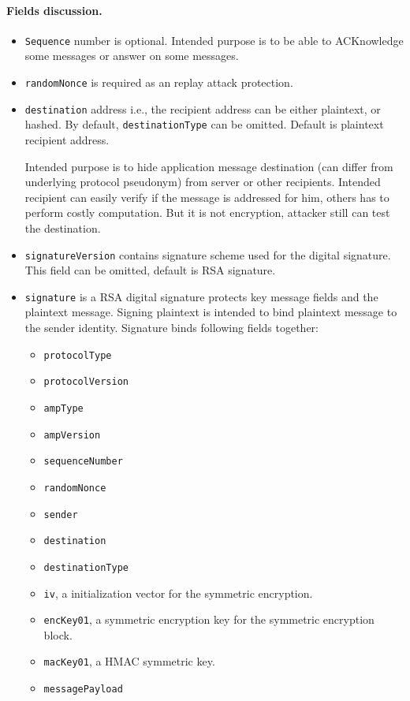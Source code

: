 \documentclass[a4paper,10pt]{article}
\begin{document}
\paragraph{Fields discussion.}
\begin{itemize}
 \item \verb#Sequence# number is optional. Intended purpose is to be able to ACKnowledge some messages or answer on some messages.
 \item \verb#randomNonce# is required as an replay attack protection.
 \item \verb#destination# address i.e., the recipient address can be either plaintext, or hashed. By default, \verb#destinationType# can be omitted.
 Default is plaintext recipient address. 
 
 Intended purpose is to hide application
 message destination (can differ from underlying protocol pseudonym) from server or other recipients. Intended recipient can easily verify 
 if the message is addressed for him, others has to perform costly computation. But it is not encryption, attacker still can test the destination.

 \item \verb#signatureVersion# contains signature scheme used for the digital signature. This field can be omitted, default is RSA signature.
 
 \item \verb#signature# is a RSA digital signature protects key message fields and the plaintext message. Signing plaintext 
 is intended to bind plaintext message to the sender identity. Signature binds following fields together:
\begin{itemize}
 \item \verb#protocolType#
 \item \verb#protocolVersion#
 \item \verb#ampType#
 \item \verb#ampVersion#
 \item \verb#sequenceNumber#
 \item \verb#randomNonce#
 \item \verb#sender#
 \item \verb#destination#
 \item \verb#destinationType#
 \item \verb#iv#, a initialization vector for the symmetric encryption.
 \item \verb#encKey01#, a symmetric encryption key for the symmetric encryption block.
 \item \verb#macKey01#, a HMAC symmetric key.
 \item \verb#messagePayload#
\end{itemize}


\end{itemize}
\end{document}

